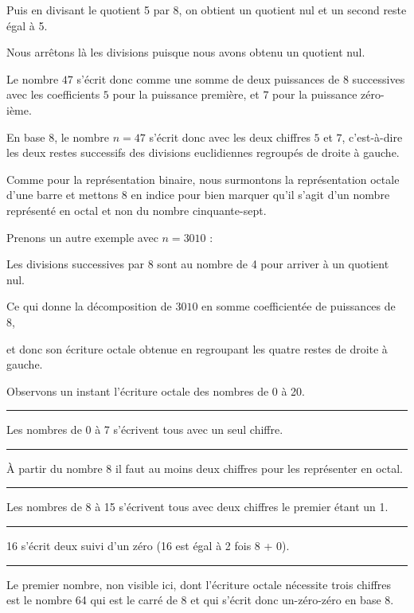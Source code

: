 Puis en divisant le quotient 5 par 8, on obtient un quotient nul et un second reste égal à 5.

Nous arrêtons là les divisions puisque nous avons obtenu un quotient nul.

\change
Le nombre $47$ s'écrit donc comme une somme de deux puissances de $8$ successives avec les coefficients $5$ pour la puissance première, et $7$ pour la puissance zéro-ième.

\change
En base 8, le nombre $n=47$ s'écrit donc avec les deux chiffres $5$ et $7$, c'est-à-dire les deux restes successifs des divisions euclidiennes regroupés de droite à gauche.

Comme pour la représentation binaire, nous surmontons la représentation octale d'une barre et mettons 8 en indice pour bien marquer qu'il s'agit d'un nombre représenté en octal et non du nombre cinquante-sept.

\change
Prenons un autre exemple avec $n=3010$ :
 
\change
Les divisions successives par 8 sont au nombre de 4 pour arriver à un quotient nul.

\change
Ce qui donne la décomposition de $3010$ en somme coefficientée de puissances de 8,

\change
et donc son écriture octale obtenue en regroupant les quatre restes de droite à gauche.

\diapo %

Observons un instant l'écriture octale des nombres de 0 à 20.

\hrule\medskip

Les nombres de 0 à 7 s'écrivent tous avec un seul chiffre.

\hrule\medskip

À partir du nombre 8 il faut au moins deux chiffres pour les représenter en octal.

\hrule\medskip

Les nombres de 8 à 15 s'écrivent tous avec deux chiffres le premier étant un 1.

\hrule\medskip

16 s'écrit deux suivi d'un zéro (16 est égal à 2 fois 8 + 0).

\hrule\medskip
Le premier nombre, non visible ici, dont l'écriture octale nécessite trois chiffres est le nombre 64 qui est le carré de 8 et qui s'écrit donc un-zéro-zéro en base 8.


